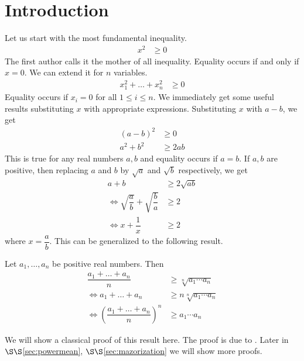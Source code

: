 \documentclass{subfile}
\begin{document}
	\section{Introduction}\label{sec:intro}%
	Let us start with the most fundamental inequality.
		\begin{align}
			x^2
				& \geq0\label{ineq:mother}
		\end{align}
	The first author calls it the mother of all inequality. Equality occurs if and only if $x=0$. We can extend it for $n$ variables.
		\begin{align}
			x_1^2+\ldots+x_n^2
				& \geq0\label{ineq:extendedmother}
		\end{align}
	Equality occurs if $x_i=0$ for all $1\leq i\leq n$. We immediately get some useful results substituting $x$ with appropriate expressions. Substituting $x$ with $a-b$, we get
		\begin{align*}
			(a-b)^2
				& \geq0\\
			a^2+b^2
				& \geq2ab
		\end{align*}
	This is true for any real numbers $a,b$ and equality occurs if $a=b$. If $a,b$ are positive, then replacing $a$ and $b$ by $\sqrt{a}$ and $\sqrt{b}$ respectively, we get
		\begin{align*}
			a+b
				& \geq2\sqrt{ab}\\
			\iff\sqrt{\dfrac{a}{b}}+\sqrt{\dfrac{b}{a}}
				& \geq2\\
			\iff x+\dfrac{1}{x}
				& \geq2
		\end{align*}
	where $x=\dfrac{a}{b}$. This can be generalized to the following result.
		\begin{theorem}\label{thm:amgm}
			Let $a_1,\ldots,a_n$ be positive real numbers. Then
				\begin{align*}
					\dfrac{a_1+\ldots+a_n}{n}
						& \geq\sqrt[n]{a_1\cdots a_n}\\
					\iff a_1+\ldots+a_n
						& \geq n\sqrt[n]{a_1\cdots a_n}\\
					\iff \left(\dfrac{a_1+\ldots+a_n}{n}\right)^n
						& \geq a_1\cdots a_n
				\end{align*}
		\end{theorem}
	We will show a classical proof of this result here. The proof is due to \textcite{cauchy_1821}. Later in \hyperref[sec:powermean]{$\S\S$\ref{sec:powermean}}, \hyperref[sec:mazorization]{$\S\S$\ref{sec:mazorization}} we will show more proofs.
\end{document}
